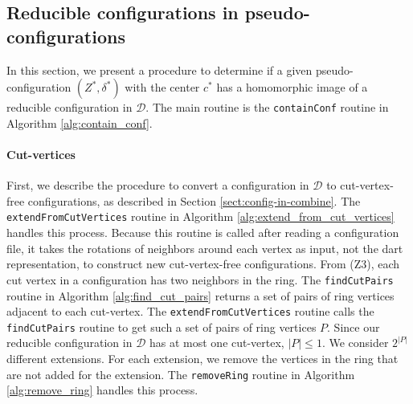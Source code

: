 \documentclass[main.tex]{subfiles}
\begin{document}
\subsection{Reducible configurations in pseudo-configurations}
\label{code:identify-reducible}
\def\CONFDEGMAX{\texttt{CONF\_DEG\_MAX}\xspace}
\def\blockByReducibleConfiguration{\texttt{blockedByReducibleConfiguration}\xspace}
\def\representativeDegree{\texttt{representativeDegree}\xspace}
\def\containConf{\texttt{containConf}\xspace}
\def\dartsByDegree{\texttt{dartsByDegree}\xspace}
\def\rootedContainConf{\texttt{rootedContainConf}\xspace}
\newcommand{\extendFromCutVertices}{\texttt{extendFromCutVertices}\xspace}
\newcommand{\findCutPairs}{\texttt{findCutPairs}\xspace}
\newcommand{\maximumDartDegree}{\texttt{maximumDartDegree}\xspace}
\newcommand{\mirror}{\texttt{mirror}\xspace}
\newcommand{\removeRing}{\texttt{removeRing}\xspace}

In this section, we present a procedure to determine if a given pseudo-configuration $(Z^*, \delta^*)$ with the center $c^*$ has a homomorphic image of a reducible configuration in $\mathcal{D}$.
The main routine is the \containConf routine in Algorithm \ref{alg:contain_conf}.

\paragraph{Cut-vertices}
First, we describe the procedure to convert a configuration in $\mathcal{D}$ to cut-vertex-free configurations, as described in Section \ref{sect:config-in-combine}.
The \extendFromCutVertices routine in Algorithm \ref{alg:extend_from_cut_vertices} handles this process.
Because this routine is called after reading a configuration file, it takes the rotations of neighbors around each vertex as input, not the dart representation, to construct new cut-vertex-free configurations.
From (Z3), each cut vertex in a configuration has two neighbors in the ring.
The \findCutPairs routine in Algorithm \ref{alg:find_cut_pairs} returns a set of pairs of ring vertices adjacent to each cut-vertex.
The \extendFromCutVertices routine calls the \findCutPairs routine to get such a set of pairs of ring vertices $P$.
Since our reducible configuration in $\mathcal{D}$ has at most one cut-vertex, $|P| \leq 1$.
We consider $2^{|P|}$ different extensions.
For each extension, we remove the vertices in the ring that are not added for the extension.
The \removeRing routine in Algorithm \ref{alg:remove_ring} handles this process.
\end{document}
